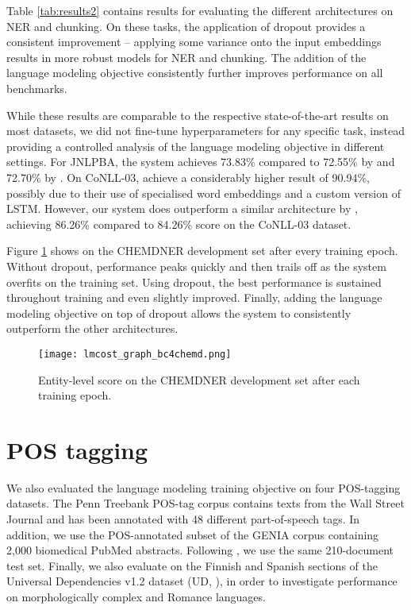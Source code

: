 \documentclass[11pt,a4paper]{article}
\begin{document}
Table \ref{tab:results2} contains results for evaluating the different architectures on NER and chunking.
On these tasks, the application of dropout provides a consistent improvement -- applying some variance onto the input embeddings results in more robust models for NER and chunking. The addition of the language modeling objective consistently further improves performance on all benchmarks.

While these results are comparable to the respective state-of-the-art results on most datasets, we did not fine-tune hyperparameters for any specific task, instead providing a controlled analysis of the language modeling objective in different settings. 
For JNLPBA, the system achieves 73.83\% compared to 72.55\% by  and 72.70\% by .
On CoNLL-03,  achieve a considerably higher result of 90.94\%, possibly due to their use of specialised word embeddings and a custom version of LSTM.
However, our system does outperform a similar architecture by , achieving 86.26\% compared to 84.26\%  score on the CoNLL-03 dataset.


Figure \ref{fig:graph_chemdner} shows  on the CHEMDNER development set after every training epoch. Without dropout, performance peaks quickly and then trails off as the system overfits on the training set. Using dropout, the best performance is sustained throughout training and even slightly improved. Finally, adding the language modeling objective on top of dropout allows the system to consistently outperform the other architectures.


\begin{figure}[h]
	\texttt{[image: lmcost\_graph\_bc4chemd.png]}
	\caption{Entity-level  score on the CHEMDNER development set after each training epoch.}
	\label{fig:graph_chemdner}
\end{figure}







\section{POS tagging}

We also evaluated the language modeling training objective on four POS-tagging datasets.
The Penn Treebank POS-tag corpus \cite{Marcus1993b} contains texts from the Wall Street Journal and has been annotated with 48 different part-of-speech tags.
In addition, we use the POS-annotated subset of the GENIA corpus \cite{Ohta2002} containing 2,000 biomedical PubMed abstracts. Following , we use the same 210-document test set. 
Finally, we also evaluate on the Finnish and Spanish sections of the Universal Dependencies v1.2 dataset (UD, ), in order to investigate performance on morphologically complex and Romance languages.
\end{document}
